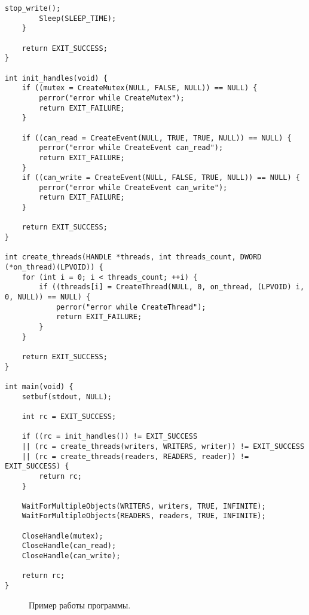 \documentclass[12pt]{report}
\begin{document}
\begin{lstlisting}[label=one,caption = Реализация монитора Хоара, style = CStyle]
		stop_write();
		Sleep(SLEEP_TIME);
	}
	
	return EXIT_SUCCESS;
}

int init_handles(void) {
	if ((mutex = CreateMutex(NULL, FALSE, NULL)) == NULL) {
		perror("error while CreateMutex");
		return EXIT_FAILURE;
	}
	
	if ((can_read = CreateEvent(NULL, TRUE, TRUE, NULL)) == NULL) {
		perror("error while CreateEvent can_read");
		return EXIT_FAILURE;
	}
	if ((can_write = CreateEvent(NULL, FALSE, TRUE, NULL)) == NULL) {
		perror("error while CreateEvent can_write");
		return EXIT_FAILURE;
	}
	
	return EXIT_SUCCESS;
}

int create_threads(HANDLE *threads, int threads_count, DWORD (*on_thread)(LPVOID)) {
	for (int i = 0; i < threads_count; ++i) {
		if ((threads[i] = CreateThread(NULL, 0, on_thread, (LPVOID) i, 0, NULL)) == NULL) {
			perror("error while CreateThread");
			return EXIT_FAILURE;
		}
	}
	
	return EXIT_SUCCESS;
}

int main(void) {
	setbuf(stdout, NULL);
	
	int rc = EXIT_SUCCESS;
	
	if ((rc = init_handles()) != EXIT_SUCCESS
	|| (rc = create_threads(writers, WRITERS, writer)) != EXIT_SUCCESS
	|| (rc = create_threads(readers, READERS, reader)) != EXIT_SUCCESS) {
		return rc;
	}
	
	WaitForMultipleObjects(WRITERS, writers, TRUE, INFINITE);
	WaitForMultipleObjects(READERS, readers, TRUE, INFINITE);
	
	CloseHandle(mutex);
	CloseHandle(can_read);
	CloseHandle(can_write);
	
	return rc;
}
\end{lstlisting}
\begin{figure}[H]
	\caption{Пример работы программы.}
	\label{ris:1}
\end{figure}
\end{document}
